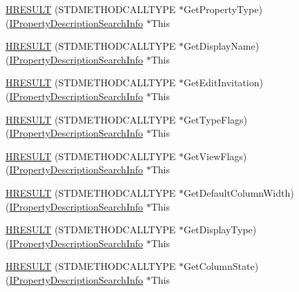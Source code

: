 \begin{DoxyCompactItemize}
\hyperlink{struct_i_property_description_search_info_vtbl_ad9c582388e4b5aae996762ff5d883067}{H\+R\+E\+S\+U\+LT} (S\+T\+D\+M\+E\+T\+H\+O\+D\+C\+A\+L\+L\+T\+Y\+PE $\ast$Get\+Property\+Type)(\hyperlink{propsys_8h_af859793a501f0bcd88d72a4382caa467}{I\+Property\+Description\+Search\+Info} $\ast$This
\item 
\hyperlink{struct_i_property_description_search_info_vtbl_a0a085ec12bde10dc85b1f96ecbf5de55}{H\+R\+E\+S\+U\+LT} (S\+T\+D\+M\+E\+T\+H\+O\+D\+C\+A\+L\+L\+T\+Y\+PE $\ast$Get\+Display\+Name)(\hyperlink{propsys_8h_af859793a501f0bcd88d72a4382caa467}{I\+Property\+Description\+Search\+Info} $\ast$This
\item 
\hyperlink{struct_i_property_description_search_info_vtbl_a5c58d472a24252b76caadd3c5ef4ab96}{H\+R\+E\+S\+U\+LT} (S\+T\+D\+M\+E\+T\+H\+O\+D\+C\+A\+L\+L\+T\+Y\+PE $\ast$Get\+Edit\+Invitation)(\hyperlink{propsys_8h_af859793a501f0bcd88d72a4382caa467}{I\+Property\+Description\+Search\+Info} $\ast$This
\item 
\hyperlink{struct_i_property_description_search_info_vtbl_a47f0be21e51e721ccddc572157d0805b}{H\+R\+E\+S\+U\+LT} (S\+T\+D\+M\+E\+T\+H\+O\+D\+C\+A\+L\+L\+T\+Y\+PE $\ast$Get\+Type\+Flags)(\hyperlink{propsys_8h_af859793a501f0bcd88d72a4382caa467}{I\+Property\+Description\+Search\+Info} $\ast$This
\item 
\hyperlink{struct_i_property_description_search_info_vtbl_a5a7a7e92db36f7769a07249edcaa2d61}{H\+R\+E\+S\+U\+LT} (S\+T\+D\+M\+E\+T\+H\+O\+D\+C\+A\+L\+L\+T\+Y\+PE $\ast$Get\+View\+Flags)(\hyperlink{propsys_8h_af859793a501f0bcd88d72a4382caa467}{I\+Property\+Description\+Search\+Info} $\ast$This
\item 
\hyperlink{struct_i_property_description_search_info_vtbl_ae523ce80d55fef3d2a30eefae708da5a}{H\+R\+E\+S\+U\+LT} (S\+T\+D\+M\+E\+T\+H\+O\+D\+C\+A\+L\+L\+T\+Y\+PE $\ast$Get\+Default\+Column\+Width)(\hyperlink{propsys_8h_af859793a501f0bcd88d72a4382caa467}{I\+Property\+Description\+Search\+Info} $\ast$This
\item 
\hyperlink{struct_i_property_description_search_info_vtbl_afc6a4df49a3e7d8418e4f197429361fa}{H\+R\+E\+S\+U\+LT} (S\+T\+D\+M\+E\+T\+H\+O\+D\+C\+A\+L\+L\+T\+Y\+PE $\ast$Get\+Display\+Type)(\hyperlink{propsys_8h_af859793a501f0bcd88d72a4382caa467}{I\+Property\+Description\+Search\+Info} $\ast$This
\item 
\hyperlink{struct_i_property_description_search_info_vtbl_ae837a1d9e5c86f3cdc6e85db351bedc3}{H\+R\+E\+S\+U\+LT} (S\+T\+D\+M\+E\+T\+H\+O\+D\+C\+A\+L\+L\+T\+Y\+PE $\ast$Get\+Column\+State)(\hyperlink{propsys_8h_af859793a501f0bcd88d72a4382caa467}{I\+Property\+Description\+Search\+Info} $\ast$This

\end{DoxyCompactItemize}
